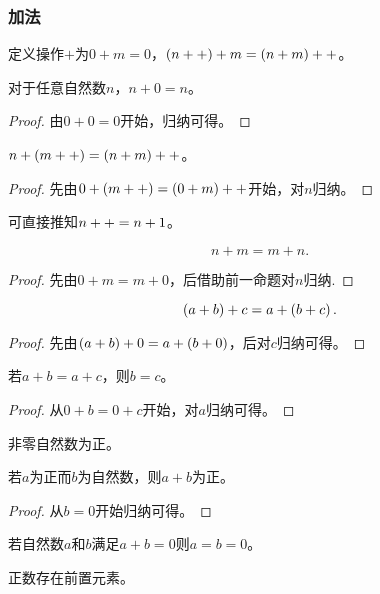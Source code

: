\documentclass{ctexrep}
\begin{document}
  \subsubsection{加法}
  \begin{definition}
    定义操作$+$为$0+m=0$，$\left(n++\right)+m=\left(n+m\right)++$。
  \end{definition}
  \begin{lemma}
    对于任意自然数$n$，$n+0=n$。
  \end{lemma}
  \begin{proof}
    由$0+0=0$开始，归纳可得。
  \end{proof}
  \begin{lemma}
    $n+\left(m++\right) = \left(n+m\right)++$。
  \end{lemma}
  \begin{proof}
    先由$0+\left(m++\right) = \left(0+m\right)++$开始，对$n$归纳。
  \end{proof}
  可直接推知$n++ = n+1$。
  \begin{proposition}
    \[ n+m=m+n. \]
  \end{proposition}
  \begin{proof}
    先由$0+m=m+0$，后借助前一命题对$n$归纳.
  \end{proof}
  \begin{proposition}
    \[ \left(a+b\right)+c = a+\left(b+c\right). \]
  \end{proposition}
  \begin{proof}
    先由$\left(a+b\right)+0=a+\left(b+0\right)$，后对$c$归纳可得。
  \end{proof}
  \begin{proposition}
    若$a+b=a+c$，则$b=c$。
  \end{proposition}
  \begin{proof}
    从$0+b=0+c$开始，对$a$归纳可得。
  \end{proof}
  \begin{definition}
    非零自然数为正。
  \end{definition}
  \begin{proposition}
    若$a$为正而$b$为自然数，则$a+b$为正。
  \end{proposition}
  \begin{proof}
    从$b=0$开始归纳可得。
  \end{proof}
  \begin{collary}
    若自然数$a$和$b$满足$a+b=0$则$a=b=0$。
  \end{collary}
  \begin{proposition}
    正数存在前置元素。
  \end{proposition}
\end{document}
